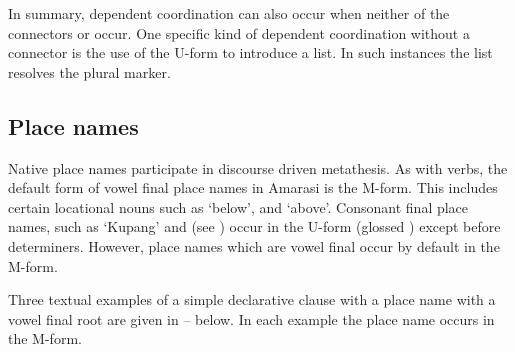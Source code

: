 In summary, dependent coordination can also occur when
neither of the connectors  or  occur.
One specific kind of dependent coordination without a connector
is the use of the U-form  {\ein} to introduce a list.
In such instances the list resolves the plural marker.

\subsection{Place names}
Native place names participate in discourse driven metathesis.
As with verbs, the default form of vowel final place names in Amarasi is the M-form.
This includes certain locational nouns
such as  {\ra}  `below',
and  {\ra}  `above'.
Consonant final place names, such as  `Kupang' and
 (see )
occur in the U-form (glossed {\Uc}) except before determiners.
However, place names which are vowel final occur by default in the M-form.

Three textual examples of a simple declarative
clause with a place name with a vowel final root are given in
-- below.
In each example the place name occurs in the M-form.

\begin{exe}
	\label{ex:130825-8, 1.00}
	\label{ex:130907-3, 5.31}
	\label{ex:160326, 17.41}
\end{exe}

